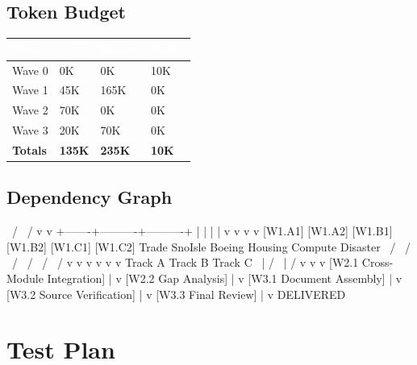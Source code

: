 \documentclass[11pt,letterpaper]{article}
\newcommand{\tableheader}[1]{\textbf{\sffamily\textcolor{white}{#1}}}
\begin{document}
\subsection{Token Budget}

\begin{center}
\begin{tabularx}{\textwidth}{L{3cm}C{2cm}C{2cm}C{2cm}}
\toprule
{}
\tableheader{Wave} & \tableheader{Opus} & \tableheader{Sonnet} & \tableheader{Haiku} \\
\midrule
Wave 0 & 0K & 0K & 10K \\
Wave 1 & 45K & 165K & 0K \\
Wave 2 & 70K & 0K & 0K \\
Wave 3 & 20K & 70K & 0K \\
\midrule
\textbf{Totals} & \textbf{135K} & \textbf{235K} & \textbf{10K} \\
\bottomrule
\end{tabularx}
\end{center}

\subsection{Dependency Graph}

\begin{asciibox}
        \              /
         \            /
          v          v
  +-------+----------+----------+
  |        |         |          |
  v        v         v          v
[W1.A1] [W1.A2]  [W1.B1] [W1.B2]  [W1.C1] [W1.C2]
Trade   SnoIsle  Boeing  Housing  Compute  Disaster
  \       /        \       /        \        /
   \     /          \     /          \      /
    v   v            v   v            v    v
    Track A          Track B         Track C
        \              |              /
         \             |             /
          v            v            v
         [W2.1 Cross-Module Integration]
                    |
                    v
            [W2.2 Gap Analysis]
                    |
                    v
          [W3.1 Document Assembly]
                    |
                    v
          [W3.2 Source Verification]
                    |
                    v
           [W3.3 Final Review]
                    |
                    v
               DELIVERED
\end{asciibox}

\section{Test Plan}
\end{document}
